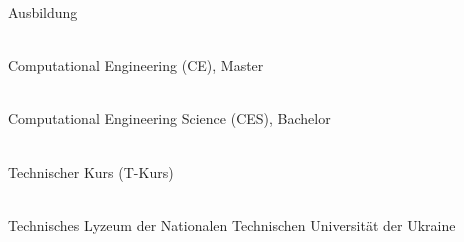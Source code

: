 \documentclass[12pt]{article} %
\begin{document}
\begin{ItemizeSection}{Ausbildung}
    \item {} \\
    Computational Engineering (CE), Master

    \item {} \\
    Computational Engineering Science (CES), Bachelor

    \item {} \\
    Technischer Kurs (T-Kurs)

    \item {} \\
    Technisches Lyzeum der Nationalen Technischen Universität der Ukraine 
\end{ItemizeSection}
\end{document}
